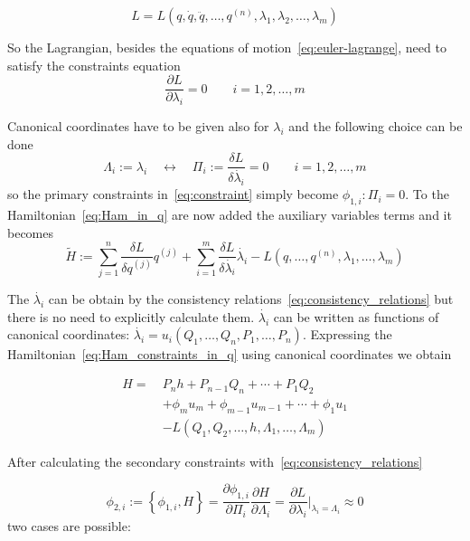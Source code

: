 \begin{equation*}
  L = L(
  q, \dot{q}, \ddot{q}, \ldots, q^{(n)},
  \lambda_1, \lambda_2, \ldots, \lambda_m
  )
\end{equation*}

So the Lagrangian, besides the equations of motion~\eqref{eq:euler-lagrange},
need to satisfy the constraints equation
\begin{equation}
  \frac{\partial L}{\partial \lambda_i} = 0 \qquad i=1, 2, \ldots, m
\end{equation}

Canonical coordinates have to be given also for $\lambda_i$ and the following
choice can be done
\begin{equation} \label{eq:def_canonical_coordinates_lambda}
  \Lambda_{i}:= \lambda_{i}
  \quad \leftrightarrow \quad
  \Pi_{i} := \frac{\delta L}{\delta \dot{\lambda_{i}}} = 0
  \qquad i = 1, 2, \ldots, m
\end{equation}
so the primary constraints in~\eqref{eq:constraint} simply become
$\phi_{1, i}: \Pi_i = 0$. To the Hamiltonian~\eqref{eq:Ham_in_q} are now added
the auxiliary variables terms and it becomes
\begin{equation} \label{eq:Ham_constraints_in_q}
  \tilde{H} :=
  \sum_{j=1}^{n} \frac{\delta L}{\delta q^{(j)}} q^{(j)} +
  \sum_{i=1}^{m} \frac{\delta L}{\delta \dot{\lambda_i}} \dot{\lambda_i} -
  L(q, \ldots, q^{(n)}, \lambda_1, \ldots, \lambda_m)
\end{equation}

The $\dot{\lambda_i}$ can be obtain by the consistency
relations~\eqref{eq:consistency_relations} but there is no need to explicitly
calculate them. $\dot{\lambda_i}$ can be written as functions of canonical
coordinates: $\dot{\lambda_i} = u_i(Q_1, \ldots, Q_n,  P_1, \ldots, P_n)$.
Expressing the Hamiltonian~\eqref{eq:Ham_constraints_in_q} using canonical
coordinates we obtain

\begin{align} \label{eq:Ham_constraints}
  H =\ & P_n h + P_{n-1} Q_n + \cdots + P_1 Q_2 \nonumber \\
       & + \phi_m u_m + \phi_{m-1} u_{m-1} + \cdots + \phi_1 u_1 \nonumber \\
       & - L ( Q_1, Q_2, \ldots, h, \Lambda_1, \ldots, \Lambda_m)
\end{align}


After calculating the secondary constraints
with~\eqref{eq:consistency_relations}

\begin{equation*}
  \phi_{2, i} := \left\{ \phi_{1,i}, H \right\} =
  \frac{\partial \phi_{1,i}}{\partial \Pi_i}
  \frac{\partial H}{\partial \Lambda_i} =
  \frac{\partial L}{\partial \lambda_i} \Big|_{\lambda_i = \Lambda_i}
  \approx 0
\end{equation*}
two cases are possible:

